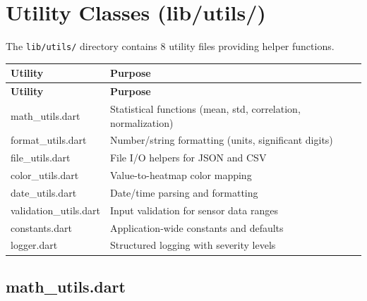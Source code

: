 \documentclass[12pt,a4paper,oneside]{report}
\begin{document}
\chapter{Utility Classes (lib/utils/)}
\label{ch:utils}

The \texttt{lib/utils/} directory contains 8 utility files providing helper functions.

\begin{longtable}{p{4cm} p{11cm}}
\toprule
\textbf{Utility} & \textbf{Purpose} \\
\midrule
\endfirsthead
\toprule
\textbf{Utility} & \textbf{Purpose} \\
\midrule
\endhead
\bottomrule
\endfoot
math\_utils.dart & Statistical functions (mean, std, correlation, normalization) \\
format\_utils.dart & Number/string formatting (units, significant digits) \\
file\_utils.dart & File I/O helpers for JSON and CSV \\
color\_utils.dart & Value-to-heatmap color mapping \\
date\_utils.dart & Date/time parsing and formatting \\
validation\_utils.dart & Input validation for sensor data ranges \\
constants.dart & Application-wide constants and defaults \\
logger.dart & Structured logging with severity levels \\
\bottomrule
\end{longtable}

\section{math\_utils.dart}
\end{document}
